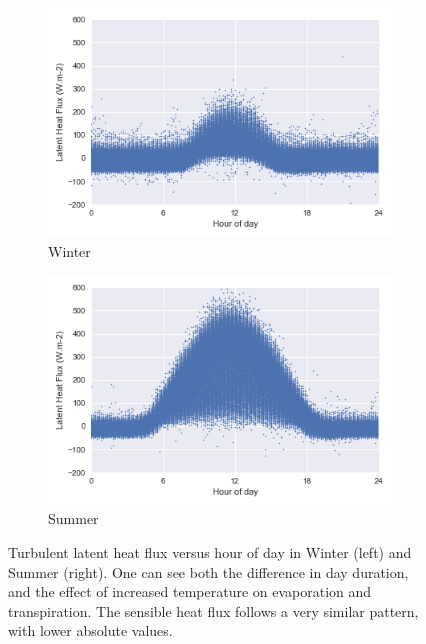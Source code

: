 \documentclass[a4paper,11pt]{kth-mag}
\begin{document}
\begin{figure}
    \centering
    \begin{subfigure}[t]{0.48\textwidth}
        \centering
        \includegraphics[width=\textwidth]{images/le_winter}
        \caption{Winter}
        \label{fig:le_winter}
    \end{subfigure}
    \hfill
    \begin{subfigure}[t]{0.48\textwidth}
        \centering
        \includegraphics[width=\textwidth]{images/le_summer}
        \caption{Summer}
        \label{fig:le_summer}
    \end{subfigure}
    \caption{Turbulent latent heat flux versus hour of day in Winter (left) and Summer (right). One can see both the difference in day duration, and the effect of increased temperature on evaporation and transpiration. The sensible heat flux follows a very similar pattern, with lower absolute values.}
	\label{fig:le_season}
\end{figure}
\end{document}
